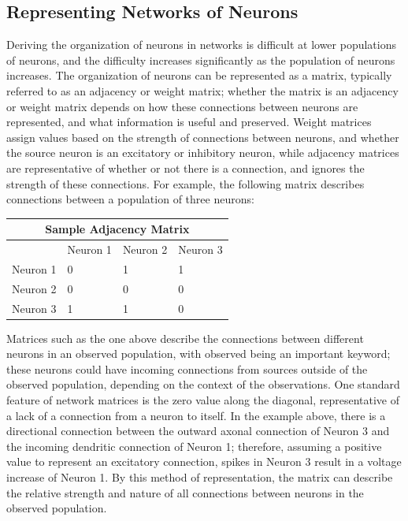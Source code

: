 \documentclass{article}
\begin{document}
\subsection{Representing Networks of Neurons}
Deriving the organization of neurons in networks is difficult at lower populations of neurons, and the difficulty increases significantly as the population of neurons increases. The organization of neurons can be represented as a matrix, typically referred to as an adjacency or weight matrix; whether the matrix is an adjacency or weight matrix depends on how these connections between neurons are represented, and what information is useful and preserved. Weight matrices assign values based on the strength of connections between neurons, and whether the source neuron is an excitatory or inhibitory neuron, while adjacency matrices are representative of whether or not there is a connection, and ignores the strength of these connections. For example, the following matrix describes connections between a population of three neurons:\par

\begin{center}
\begin{tabular}{ |p{3cm}|p{3cm}|p{3cm}|p{3cm}|  }
 \hline
 \multicolumn{4}{|c|}{Sample Adjacency Matrix} \\
 \hline
  & Neuron 1 & Neuron 2 & Neuron 3\\
 \hline
 Neuron 1 & 0 & 1 & 1\\
 Neuron 2 & 0 & 0 & 0\\
 Neuron 3 & 1 & 1 & 0\\
 \hline
\end{tabular}
\end{center}

Matrices such as the one above describe the connections between different neurons in an observed population, with observed being an important keyword; these neurons could have incoming connections from sources outside of the observed population, depending on the context of the observations. One standard feature of network matrices is the zero value along the diagonal, representative of a lack of a connection from a neuron to itself. In the example above, there is a directional connection between the outward axonal connection of Neuron 3 and the incoming dendritic connection of Neuron 1; therefore, assuming a positive value to represent an excitatory connection, spikes in Neuron 3 result in a voltage increase of Neuron 1. By this method of representation, the matrix can describe the relative strength and nature of all connections between neurons in the observed population.\par
\end{document}
